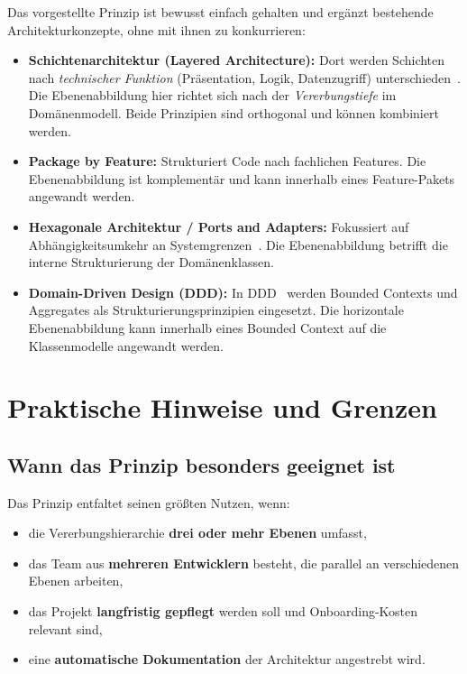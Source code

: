 ﻿\documentclass[a4paper,12pt]{article}
\begin{document}
Das vorgestellte Prinzip ist bewusst einfach gehalten und ergänzt bestehende
Architekturkonzepte, ohne mit ihnen zu konkurrieren:

\begin{itemize}[leftmargin=*]
	\item \textbf{Schichtenarchitektur (Layered Architecture):} Dort werden
	Schichten nach \textit{technischer Funktion} (Präsentation, Logik,
	Datenzugriff) unterschieden~\cite{fowler2002}. Die Ebenenabbildung
	hier richtet sich nach der \textit{Vererbungstiefe} im Domänenmodell.
	Beide Prinzipien sind orthogonal und können kombiniert werden.
	
	\item \textbf{Package by Feature:} Strukturiert Code nach fachlichen
	Features. Die Ebenenabbildung ist komplementär und kann innerhalb
	eines Feature-Pakets angewandt werden.
	
	\item \textbf{Hexagonale Architektur / Ports and Adapters:} Fokussiert auf
	Abhängigkeitsumkehr an Systemgrenzen~\cite{cockburn2005}. Die
	Ebenenabbildung betrifft die interne Strukturierung der Domänenklassen.
	
	\item \textbf{Domain-Driven Design (DDD):} In DDD~\cite{evans2003} werden
	Bounded Contexts und Aggregates als Strukturierungsprinzipien eingesetzt.
	Die horizontale Ebenenabbildung kann innerhalb eines Bounded Context
	auf die Klassenmodelle angewandt werden.
\end{itemize}

\section{Praktische Hinweise und Grenzen}

\subsection{Wann das Prinzip besonders geeignet ist}

Das Prinzip entfaltet seinen größten Nutzen, wenn:
\begin{itemize}[leftmargin=*]
	\item die Vererbungshierarchie \textbf{drei oder mehr Ebenen} umfasst,
	\item das Team aus \textbf{mehreren Entwicklern} besteht, die parallel an
	verschiedenen Ebenen arbeiten,
	\item das Projekt \textbf{langfristig gepflegt} werden soll und
	Onboarding-Kosten relevant sind,
	\item eine \textbf{automatische Dokumentation} der Architektur angestrebt wird.
\end{itemize}
\end{document}
